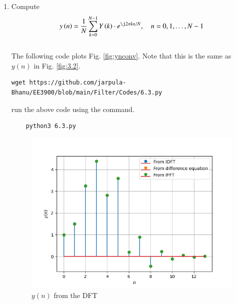 \documentclass[journal,12pt,twocolumn]{IEEEtran}
\renewcommand\thesection{\arabic{section}}
\begin{document}
\begin{enumerate}[label=\thesection.\arabic*
,ref=\thesection.\theenumi]
\item Compute
\begin{equation} \label{6.3}
 y\brak{n}={\frac {1}{N}}\sum _{k=0}^{N-1}Y\brak{k}\cdot e^{\j 2\pi kn/N},\quad n = 0,1,\dots, N-1
\end{equation}
\\
\solution The following code plots Fig. \ref{fig:ynconv}. Note that this is the same as 
$y(n)$ in  Fig. 
\ref{fig:3.2}. 
%
\begin{lstlisting}
wget https://github.com/jarpula-Bhanu/EE3900/blob/main/Filter/Codes/6.3.py
\end{lstlisting}
run the above code using the command.
\begin{lstlisting}
	python3 6.3.py
\end{lstlisting}

\begin{figure}[!ht]
\centering
\includegraphics[width=\columnwidth]{./figs/6.3.png}
\caption{$y(n)$ from the DFT}
\label{fig:yndft}
\end{figure}


\end{enumerate}
\end{document}
